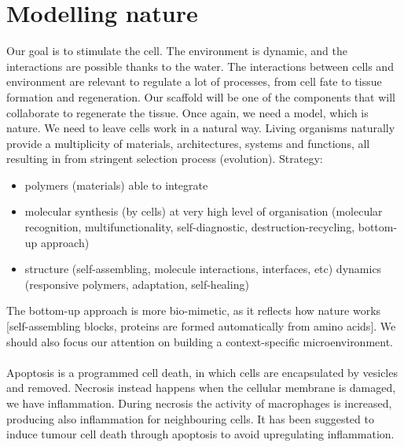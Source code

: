 \section{Modelling nature}
Our goal is to stimulate the cell. 
The environment is dynamic, and the interactions are possible thanks to the water. 
The interactions between cells and environment are relevant to regulate a lot of processes, from cell fate to tissue formation and regeneration. 
Our scaffold will be one of the components that will collaborate to regenerate the tissue.
Once again, we need a model, which is nature. 
We need to leave cells work in a natural way. 
Living organisms naturally provide a multiplicity of materials, architectures, systems and functions, all resulting in from stringent selection process (evolution).
\noindent
Strategy:
\begin{itemize}
\item polymers (materials) able to integrate
\item molecular synthesis (by cells) at very high level of organisation (molecular recognition, multifunctionality, self-diagnostic, destruction-recycling, bottom-up approach)
\item structure (self-assembling, molecule interactions, interfaces, etc) dynamics
(responsive polymers, adaptation, self-healing)
\end{itemize}
\noindent
The bottom-up approach is more bio-mimetic,  as it reflects how nature works [self-assembling blocks, proteins are formed automatically from amino acids]. 
We should also focus our attention on building a context-specific microenvironment.
\\
\\
\noindent
Apoptosis is a programmed cell death, in which cells are encapsulated by vesicles and removed.
Necrosis instead happens when the cellular membrane is damaged, we have inflammation. 
During necrosis the activity of macrophages is increased, producing also inflammation for neighbouring cells. 
It has been suggested to induce tumour cell death through apoptosis to avoid upregulating inflammation. 
